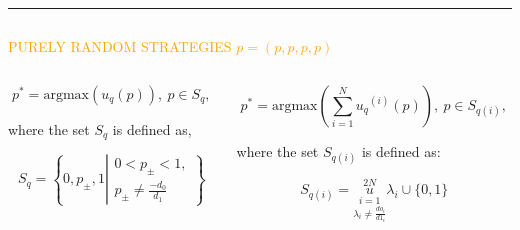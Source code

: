\documentclass[usenames,dvipsnames,t]{beamer}
\begin{document}
\hrule height 3pt
\begin{columns}
    \begin{column}{.8\linewidth}
        \begin{center}
            \textcolor{orange}{\Large{PURELY RANDOM STRATEGIES \(p=(p, p, p, p)\)}}
            \vspace{1cm}

            \hspace{-2cm}
        \end{center}
\begin{columns}
    \begin{column}{.4\linewidth}
        \begin{minipage}{50cm}
        \begin{block}

            \[p^* = \text{argmax}(u_q(p)), \ p \in S_q,\]
            \vspace{0.3cm}

            \small{
            where the set \(S_q\) is defined as,}
        
            \[S_q = \left \{0, p_{\pm}, 1 \left | \begin{array}{l} 0 < p_{\pm} < 1,
            \\ p_{\pm} \neq \frac{-d_0}{d_1} \end{array} \right. \right\}\] \\

        \end{block}
    \end{minipage}
    \end{column}
    \begin{column}{.4\linewidth}
        \begin{minipage}{50cm}
            \begin{block}

            \[p^* = \text{argmax}(\displaystyle \sum_{i=1} ^ {N} {u_q}^{(i)} (p)), \ p \in S_{q(i)},\]
            \vspace{0.3cm}

            \small{
            where the set \(S_{q(i)}\) is defined as:}

            \[ S_{q(i)} =  \overset{2N}{\underset{\lambda_i \neq \frac{do_i}{d1_i}}{\underset{i=1}{u}}} \lambda_i \cup \{0, 1\} \]
            \end{block}
        \end{minipage}
    \end{column}
\end{columns}
\vspace{0.7cm}


\end{column}
\end{columns}
\end{document}
